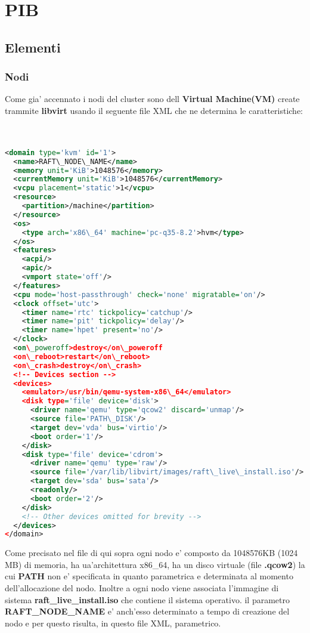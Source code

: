\usepackage{listings}

\section{PIB}
\subsection{Elementi}
\subsubsection{Nodi}
Come gia' accennato i nodi del cluster sono dell \textbf{Virtual Machine(VM)} create trammite 
\textbf{libvirt} usando il seguente file XML che ne determina le caratteristiche:
\\
\\
\\
\begin{lstlisting}[language=XML]
<domain type='kvm' id='1'>
  <name>RAFT\_NODE\_NAME</name>
  <memory unit='KiB'>1048576</memory>
  <currentMemory unit='KiB'>1048576</currentMemory>
  <vcpu placement='static'>1</vcpu>
  <resource>
    <partition>/machine</partition>
  </resource>
  <os>
    <type arch='x86\_64' machine='pc-q35-8.2'>hvm</type>
  </os>
  <features>
    <acpi/>
    <apic/>
    <vmport state='off'/>
  </features>
  <cpu mode='host-passthrough' check='none' migratable='on'/>
  <clock offset='utc'>
    <timer name='rtc' tickpolicy='catchup'/>
    <timer name='pit' tickpolicy='delay'/>
    <timer name='hpet' present='no'/>
  </clock>
  <on\_poweroff>destroy</on\_poweroff
  <on\_reboot>restart</on\_reboot>
  <on\_crash>destroy</on\_crash>
  <!-- Devices section -->
  <devices>
    <emulator>/usr/bin/qemu-system-x86\_64</emulator>
    <disk type='file' device='disk'>
      <driver name='qemu' type='qcow2' discard='unmap'/>
      <source file='PATH\_DISK'/>
      <target dev='vda' bus='virtio'/>
      <boot order='1'/>
    </disk>
    <disk type='file' device='cdrom'>
      <driver name='qemu' type='raw'/>
      <source file='/var/lib/libvirt/images/raft\_live\_install.iso'/>
      <target dev='sda' bus='sata'/>
      <readonly/>
      <boot order='2'/>
    </disk>
    <!-- Other devices omitted for brevity -->
  </devices>
</domain>
\end{lstlisting}

Come precisato nel file di qui sopra ogni nodo e' composto da 1048576KB (1024 MB) di memoria,
ha ua'architettura x86\_64, ha un disco virtuale (file \textbf{.qcow2}) la cui \textbf{PATH} 
non e' specificata in quanto parametrica e determinata al momento dell'allocazione del nodo.
Inoltre a ogni nodo viene associata l'immagine di sistema \textbf{raft\_live\_install.iso} che 
contiene il sistema operativo. il parametro \textbf{RAFT\_NODE\_NAME} e' anch'esso determinato
a tempo di creazione del nodo e per questo risulta, in questo file XML, parametrico.

